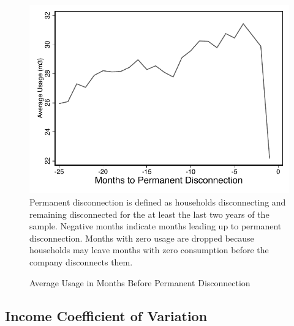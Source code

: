 \documentclass[12pt]{article}
\begin{document}
\begin{figure}[H]
\centering
\caption{Average Usage in Months Before Permanent Disconnection}\label{figure:dc_permanent}
\includegraphics[scale=.7]{tables/line_disc_graph.pdf} \\
{ \footnotesize Permanent disconnection is defined as households disconnecting and remaining disconnected for the at least the last two years of the sample.  Negative months indicate months leading up to permanent disconnection.  Months with zero usage are dropped because households may leave months with zero consumption before the company disconnects them. }
\end{figure}


\subsection{Income Coefficient of Variation}\label{appendix:cvcalc}
\end{document}
